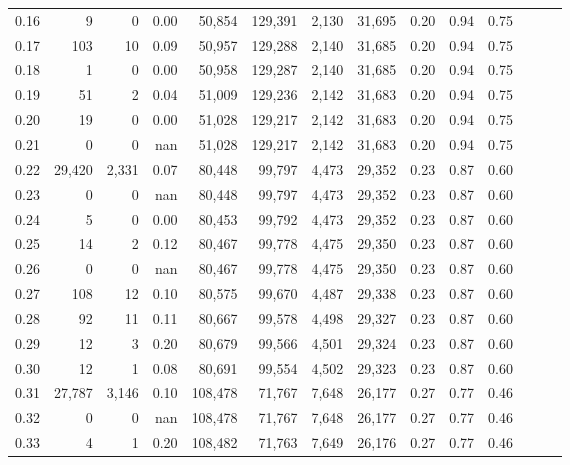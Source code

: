 \begin{tabular}{rrrrrrrrrrrrrr}
0.16 &       9 &      0 &  0.00 &   50,854 &  129,391 &   2,130 &  31,695 &  0.20 &  0.94 &      0.75 \\
0.17 &     103 &     10 &  0.09 &   50,957 &  129,288 &   2,140 &  31,685 &  0.20 &  0.94 &      0.75 \\
0.18 &       1 &      0 &  0.00 &   50,958 &  129,287 &   2,140 &  31,685 &  0.20 &  0.94 &      0.75 \\
0.19 &      51 &      2 &  0.04 &   51,009 &  129,236 &   2,142 &  31,683 &  0.20 &  0.94 &      0.75 \\
0.20 &      19 &      0 &  0.00 &   51,028 &  129,217 &   2,142 &  31,683 &  0.20 &  0.94 &      0.75 \\
0.21 &       0 &      0 &   nan &   51,028 &  129,217 &   2,142 &  31,683 &  0.20 &  0.94 &      0.75 \\
0.22 &  29,420 &  2,331 &  0.07 &   80,448 &   99,797 &   4,473 &  29,352 &  0.23 &  0.87 &      0.60 \\
0.23 &       0 &      0 &   nan &   80,448 &   99,797 &   4,473 &  29,352 &  0.23 &  0.87 &      0.60 \\
0.24 &       5 &      0 &  0.00 &   80,453 &   99,792 &   4,473 &  29,352 &  0.23 &  0.87 &      0.60 \\
0.25 &      14 &      2 &  0.12 &   80,467 &   99,778 &   4,475 &  29,350 &  0.23 &  0.87 &      0.60 \\
0.26 &       0 &      0 &   nan &   80,467 &   99,778 &   4,475 &  29,350 &  0.23 &  0.87 &      0.60 \\
0.27 &     108 &     12 &  0.10 &   80,575 &   99,670 &   4,487 &  29,338 &  0.23 &  0.87 &      0.60 \\
0.28 &      92 &     11 &  0.11 &   80,667 &   99,578 &   4,498 &  29,327 &  0.23 &  0.87 &      0.60 \\
0.29 &      12 &      3 &  0.20 &   80,679 &   99,566 &   4,501 &  29,324 &  0.23 &  0.87 &      0.60 \\
0.30 &      12 &      1 &  0.08 &   80,691 &   99,554 &   4,502 &  29,323 &  0.23 &  0.87 &      0.60 \\
0.31 &  27,787 &  3,146 &  0.10 &  108,478 &   71,767 &   7,648 &  26,177 &  0.27 &  0.77 &      0.46 \\
0.32 &       0 &      0 &   nan &  108,478 &   71,767 &   7,648 &  26,177 &  0.27 &  0.77 &      0.46 \\
0.33 &       4 &      1 &  0.20 &  108,482 &   71,763 &   7,649 &  26,176 &  0.27 &  0.77 &      0.46 \\

\end{tabular}
